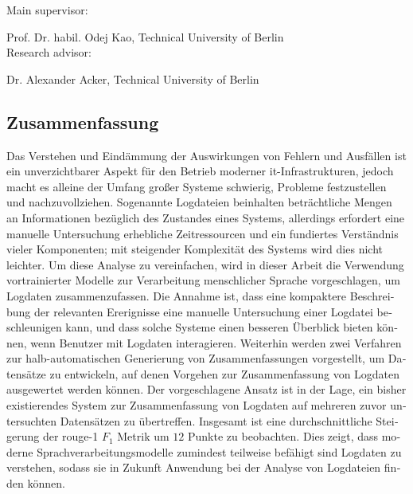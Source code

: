 Main supervisor:

Prof. Dr. habil. Odej Kao, Technical University of Berlin\\[1em]

Research advisor:

Dr. Alexander Acker, Technical University of Berlin

\begin{otherlanguage}{ngerman}
\chapter*{\vspace{-2cm}Zusammenfassung}
\thispagestyle{empty}

\vspace{-0.5cm}

Das Verstehen und Eindämmung der Auswirkungen von Fehlern und Ausfällen ist ein unverzichtbarer Aspekt für den Betrieb moderner \Ac{it}-Infrastrukturen,
jedoch macht es alleine der Umfang großer Systeme schwierig, Probleme festzustellen und nachzuvollziehen.
Sogenannte Logdateien beinhalten beträchtliche Mengen an Informationen bezüglich des Zustandes eines Systems,
allerdings erfordert eine manuelle Untersuchung erhebliche Zeitressourcen und ein fundiertes Verständnis vieler Komponenten;
mit steigender Komplexität des Systems wird dies nicht leichter.
Um diese Analyse zu vereinfachen, wird in dieser Arbeit die Verwendung vortrainierter Modelle zur Verarbeitung menschlicher Sprache vorgeschlagen,
um Logdaten zusammenzufassen.
Die Annahme ist, dass eine kompaktere Beschreibung der relevanten Ererignisse eine manuelle Untersuchung einer Logdatei beschleunigen kann,
und dass solche Systeme einen besseren Überblick bieten können, wenn Benutzer mit Logdaten interagieren.
Weiterhin werden zwei Verfahren zur halb-automatischen Generierung von Zusammenfassungen vorgestellt,
um Datensätze zu entwickeln, auf denen Vorgehen zur Zusammenfassung von Logdaten ausgewertet werden können.
Der vorgeschlagene Ansatz ist in der Lage, ein bisher existierendes System zur Zusammenfassung von Logdaten
auf mehreren zuvor untersuchten Datensätzen zu übertreffen.
Insgesamt ist eine durchschnittliche Steigerung der \acs*{rouge}-1 \(F_1\) Metrik um \(12\) Punkte zu beobachten.
Dies zeigt, dass moderne Sprachverarbeitungsmodelle zumindest teilweise befähigt sind Logdaten zu verstehen,
sodass sie in Zukunft Anwendung bei der Analyse von Logdateien finden können.
\end{otherlanguage}

